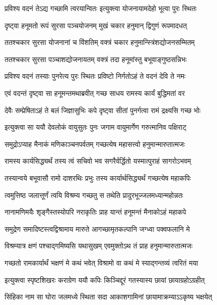 \twolineshloka
{प्रविश्य वदनं तेऽद्य गच्छामि त्वरयान्वितः}
{इत्युक्त्वा योजनायामदेहो भूत्वा पुरः स्थितः} %

\twolineshloka
{दृष्ट्वा हनूमतो रूपं सुरसा पञ्चयोजनम्}
{मुखं चकार हनुमान् द्विगुणं रूपमादधत्} %

\twolineshloka
{ततश्चकार सुरसा योजनानां च विंशतिम्}
{वक्त्रं चकार हनुमान्स्त्रिंशद्योजनसम्मितम्} %

\twolineshloka
{ततश्चकार सुरसा पञ्चाशद्योजनायतम्}
{वक्त्रं तदा हनूमांस्तु बभूवाङ्गुष्ठसन्निभः} %

\twolineshloka
{प्रविश्य वदनं तस्याः पुनरेत्य पुरः स्थितः}
{प्रविष्टो निर्गतोऽहं ते वदनं देवि ते नमः} %

\twolineshloka
{एवं वदन्तं दृष्ट्वा सा हनूमन्तमथाब्रवीत्}
{गच्छ साधय रामस्य कार्यं बुद्धिमतां वर} %

\twolineshloka
{देवैः सम्प्रेषिताऽहं ते बलं जिज्ञासुभिः कपे}
{दृष्ट्वा सीतां पुनर्गत्वा रामं द्रक्ष्यसि गच्छ भोः} %

\twolineshloka
{इत्युक्त्वा सा ययौ देवलोकं वायुसुतः पुनः}
{जगाम वायुमार्गेण गरुत्मानिव पक्षिराट्} %

\twolineshloka
{समुद्रोऽप्याह मैनाकं मणिकाञ्चनपर्वतम्}
{गच्छत्येष महासत्त्वो हनुमान्मारुतात्मजः} %

\twolineshloka
{रामस्य कार्यसिद्ध्यर्थं तस्य त्वं सचिवो भव}
{सगरैर्वर्द्धितो यस्मात्पुराहं सागरोऽभवम्} %

\twolineshloka
{तस्यान्वये बभूवासौ रामो दाशरथिः प्रभुः}
{तस्य कार्यार्थसिद्ध्यर्थं गच्छत्येष महाकपिः} %

\twolineshloka
{त्वमुत्तिष्ठ जलात्तूर्णं त्वयि विश्रम्य गच्छतु}
{स तथेति प्रादुरभूज्जलमध्यान्महोन्नतः} %

\twolineshloka
{नानामणिमयैः शृङ्गैस्तस्योपरि नराकृतिः}
{प्राह यान्तं हनूमन्तं मैनाकोऽहं महाकपे} %

\twolineshloka
{समुद्रेण समादिष्टस्त्वद्विश्रामाय मारुते}
{आगच्छामृतकल्पानि जग्ध्वा पक्वफलानि मे} %

\twolineshloka
{विश्रम्यात्र क्षणं पश्चाद्गमिष्यसि यथासुखम्}
{एवमुक्तोऽथ तं प्राह हनुमान्मारुतात्मजः} %

\twolineshloka
{गच्छतो रामकार्यार्थं भक्षणं मे कथं भवेत्}
{विश्रामो वा कथं मे स्याद्गन्तव्यं त्वरितं मया} %

\twolineshloka
{इत्युक्त्वा स्पृष्टशिखरः कराग्रेण ययौ कपिः}
{किञ्चिद्दूरं गतस्यास्य छायां छायाग्रहोऽग्रहीत्} %

\twolineshloka
{सिंहिका नाम सा घोरा जलमध्ये स्थिता सदा}
{आकाशगामिनां छायामाक्रम्याऽऽकृष्य भक्षयेत्} %

